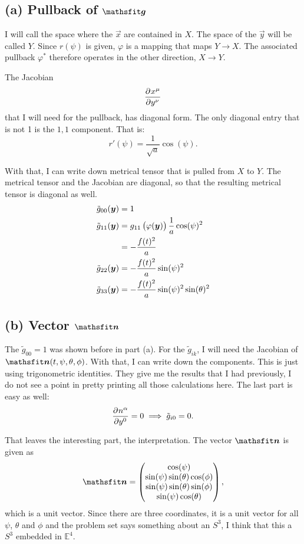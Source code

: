 \subsection*{(a) Pullback of $\tens g$}

I will call the space where the $\vec x$ are contained in $X$. The space of the
$\vec y$ will be called $Y$. Since $r(\psi)$ is given, $\varphi$ is a mapping that
maps $Y \to X$. The associated pullback $\varphi^*$ therefore operates in the
other direction, $X \to Y$.

The Jacobian
\[
    \dpd{{x^\mu}}{{y^\nu}}
\]
that I will need for the pullback, has diagonal form. The only diagonal entry
that is not 1 is the $1,1$ component. That is:
\[
    r'(\psi) = \frac{1}{\sqrt a} \cos(\psi).
\]

With that, I can write down metrical tensor that is pulled from $X$ to $Y$. The
metrical tensor and the Jacobian are diagonal, so that the resulting metrical
tensor is diagonal as well.
\begin{align*}
    \tilde g_{00}(\vec y) &= 1 \\
    \tilde g_{11}(\vec y) &= g_{11}\del{\varphi(\vec y)} \frac 1a \cos(\psi)^2 \\
    &= - \frac{f(t)^2}{a} \\
    \tilde g_{22}(\vec y) &= - \frac{f(t)^2}a \sin(\psi)^2 \\
    \tilde g_{33}(\vec y) &= - \frac{f(t)^2}a \sin(\psi)^2 \sin(\theta)^2
\end{align*}

\subsection*{(b) Vector $\tens n$}

The $\tilde g_{00} = 1$ was shown before in part (a). For the $\tilde g_{ik}$,
I will need the Jacobian of $\tens n(t, \psi, \theta, \phi)$. With that, I can
write down the components. This is just using trigonometric identities. They
give me the results that I had previously, I do not see a point in pretty
printing all those calculations here. The last part is easy as well:
\[
    \dpd{{n^\alpha}}{{y^0}} = 0 \implies \tilde g_{i0} = 0.
\]

That leaves the interesting part, the interpretation. The vector $\tens n$ is
given as
\[
    \tens n = \begin{pmatrix}
        \cos(\psi) \\
        \sin(\psi) \sin(\theta) \cos(\phi) \\
        \sin(\psi) \sin(\theta) \sin(\phi) \\
        \sin(\psi) \cos(\theta) \\
    \end{pmatrix},
\]
which is a unit vector. Since there are three coordinates, it is a unit vector
for all $\psi$, $\theta$ and $\phi$ and the problem set says something about an
$S^3$, I think that this a $S^3$ embedded in $\mathbb E^4$.

